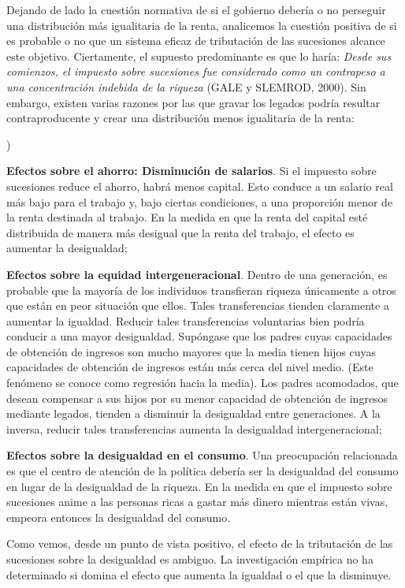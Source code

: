\documentclass[10pt,a4paper]{article}
\newcounter{alphaitem}
\newenvironment{la}
      {\begin{list}{\alph{alphaitem})}{%
          \usecounter{alphaitem}%
          \setlength{\leftmargin}{1cm}%
          \setlength{\parskip}{3pt}%
          \setlength{\itemsep}{0pt}%
          \setlength{\parsep}{0pt}%
      }}
      {\end{list}}
\begin{document}
Dejando de lado la cuestión normativa de si el gobierno debería o no perseguir una distribución más igualitaria de la renta, analicemos la cuestión positiva de si es probable o no que un sistema eficaz de tributación de las sucesiones alcance este objetivo. Ciertamente, el supuesto predominante es que lo haría: \textit{Desde sus comienzos, el impuesto sobre sucesiones fue considerado como un contrapeso a una concentración indebida de la riqueza} (GALE y SLEMROD, 2000). Sin embargo, existen varias razones por las que gravar los legados podría resultar contraproducente y crear una distribución menos igualitaria de la renta:
\begin{la}
    \item \textbf{Efectos sobre el ahorro: Disminución de salarios}. Si el impuesto sobre sucesiones reduce el ahorro, habrá menos capital. Esto conduce a un salario real más bajo para el trabajo y, bajo ciertas condiciones, a una proporción menor de la renta destinada al trabajo. En la medida en que la renta del capital esté distribuida de manera más desigual que la renta del trabajo, el efecto es aumentar la desigualdad;
    \item \textbf{Efectos sobre la equidad intergeneracional}. Dentro de una generación, es probable que la mayoría de los individuos transfieran riqueza únicamente a otros que están en peor situación que ellos. Tales transferencias tienden claramente a aumentar la igualdad. Reducir tales transferencias voluntarias bien podría conducir a una mayor desigualdad. Supóngase que los padres cuyas capacidades de obtención de ingresos son mucho mayores que la media tienen hijos cuyas capacidades de obtención de ingresos están más cerca del nivel medio. (Este fenómeno se conoce como regresión hacia la media). Los padres acomodados, que desean compensar a sus hijos por su menor capacidad de obtención de ingresos mediante legados, tienden a disminuir la desigualdad entre generaciones. A la inversa, reducir tales transferencias aumenta la desigualdad intergeneracional;
    \item \textbf{Efectos sobre la desigualdad en el consumo}. Una preocupación relacionada es que el centro de atención de la política debería ser la desigualdad del consumo en lugar de la desigualdad de la riqueza. En la medida en que el impuesto sobre sucesiones anime a las personas ricas a gastar más dinero mientras están vivas, empeora entonces la desigualdad del consumo. 
\end{la}

Como vemos, desde un punto de vista positivo, el efecto de la tributación de las sucesiones sobre la desigualdad es ambiguo. La investigación empírica no ha determinado si domina el efecto que aumenta la igualdad o el que la disminuye.
\end{document}
